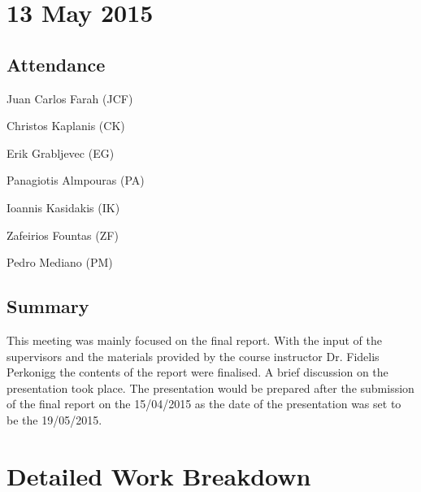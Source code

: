 \documentclass[a4paper,11pt]{article}
\begin{document}
\maketitle
\section*{13 May 2015}
\subsection*{Attendance}
\begin{compactenum}
\item Juan Carlos Farah (JCF)
\item Christos Kaplanis (CK)
\item Erik Grabljevec (EG)
\item Panagiotis Almpouras (PA)
\item Ioannis Kasidakis (IK)
\item Zafeirios Fountas (ZF)
\item Pedro Mediano (PM)
\end{compactenum}

\subsection*{Summary}
This meeting was mainly focused on the final report. With the input of the supervisors and the materials provided by the course instructor Dr. Fidelis Perkonigg the contents of the report were finalised. A brief discussion on the presentation took place. The presentation would be prepared after the submission of the final report on the 15/04/2015 as the date of the presentation was set to be the 19/05/2015.



\clearpage
\section{Detailed Work Breakdown}
\end{document}
